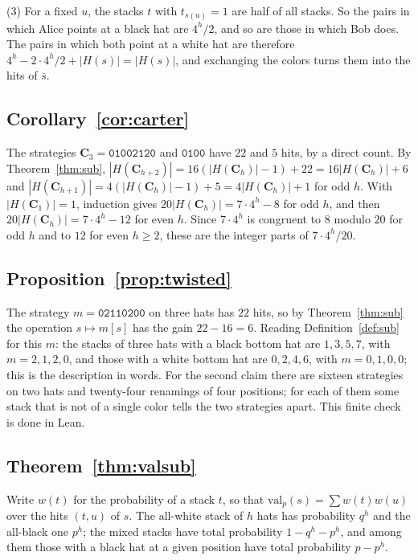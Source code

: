 \documentclass[11pt,a4paper]{article}
\theoremstyle{definition}
\theoremstyle{remark}
\newcommand{\str}[1]{\mathtt{#1}}
\newcommand{\C}{\mathbf{C}}
\begin{document}
(3) For a fixed $u$, the stacks $t$ with $t_{s(u)} = 1$ are half of all
stacks. So the pairs in which Alice points at a black hat are $4^h/2$,
and so are those in which Bob does. The pairs in which both point at a
white hat are therefore $4^h - 2\cdot 4^h/2 + |H(s)| = |H(s)|$, and
exchanging the colors turns them into the hits of $\bar s$.

\subsection{Corollary~\ref{cor:carter}}\label{app:carter}

The strategies $\C_3 = \str{01002120}$ and $\str{0100}$ have $22$ and
$5$ hits, by a direct count. By Theorem~\ref{thm:sub},
$|H(\C_{h+2})| = 16(|H(\C_h)|-1) + 22 = 16|H(\C_h)| + 6$ and
$|H(\C_{h+1})| = 4(|H(\C_h)|-1)+5 = 4|H(\C_h)|+1$ for odd $h$. With
$|H(\C_1)| = 1$, induction gives $20|H(\C_h)| = 7\cdot 4^h - 8$ for odd
$h$, and then $20|H(\C_h)| = 7\cdot 4^h - 12$ for even $h$. Since
$7\cdot 4^h$ is congruent to $8$ modulo $20$ for odd $h$ and to $12$ for
even $h \ge 2$, these are the integer parts of $7\cdot 4^h/20$.

\subsection{Proposition~\ref{prop:twisted}}\label{app:twisted}

The strategy $m = \str{02110200}$ on three hats has $22$ hits, so by
Theorem~\ref{thm:sub} the operation $s \mapsto m[s]$ has the gain
$22 - 16 = 6$. Reading Definition~\ref{def:sub} for this $m$: the stacks
of three hats with a black bottom hat are $1,3,5,7$, with
$m = 2,1,2,0$, and those with a white bottom hat are $0,2,4,6$, with
$m = 0,1,0,0$; this is the description in words. For the second claim
there are sixteen strategies on two hats and twenty-four renamings of
four positions; for each of them some stack that is not of a single
color tells the two strategies apart. This finite check is done in Lean.

\subsection{Theorem~\ref{thm:valsub}}\label{app:valsub}

Write $w(t)$ for the probability of a stack $t$, so that
$\mathrm{val}_p(s) = \sum w(t)w(u)$ over the hits $(t,u)$ of $s$. The
all-white stack of $h$ hats has probability $q^h$ and the all-black one
$p^h$; the mixed stacks have total probability $1 - q^h - p^h$, and
among them those with a black hat at a given position have total
probability $p - p^h$.
\end{document}
